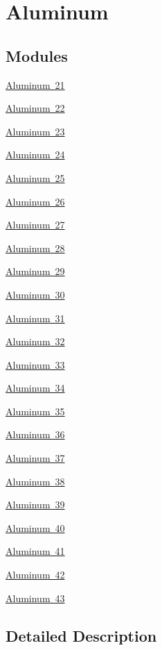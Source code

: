 \hypertarget{group___isotope_const-_aluminum}{}\section{Aluminum}
\label{group___isotope_const-_aluminum}
\subsection*{Modules}
\begin{DoxyCompactItemize}
\item 
\mbox{\hyperlink{group___isotope_const-_aluminum-_al21}{Aluminum 21}}
\item 
\mbox{\hyperlink{group___isotope_const-_aluminum-_al22}{Aluminum 22}}
\item 
\mbox{\hyperlink{group___isotope_const-_aluminum-_al23}{Aluminum 23}}
\item 
\mbox{\hyperlink{group___isotope_const-_aluminum-_al24}{Aluminum 24}}
\item 
\mbox{\hyperlink{group___isotope_const-_aluminum-_al25}{Aluminum 25}}
\item 
\mbox{\hyperlink{group___isotope_const-_aluminum-_al26}{Aluminum 26}}
\item 
\mbox{\hyperlink{group___isotope_const-_aluminum-_al27}{Aluminum 27}}
\item 
\mbox{\hyperlink{group___isotope_const-_aluminum-_al28}{Aluminum 28}}
\item 
\mbox{\hyperlink{group___isotope_const-_aluminum-_al29}{Aluminum 29}}
\item 
\mbox{\hyperlink{group___isotope_const-_aluminum-_al30}{Aluminum 30}}
\item 
\mbox{\hyperlink{group___isotope_const-_aluminum-_al31}{Aluminum 31}}
\item 
\mbox{\hyperlink{group___isotope_const-_aluminum-_al32}{Aluminum 32}}
\item 
\mbox{\hyperlink{group___isotope_const-_aluminum-_al33}{Aluminum 33}}
\item 
\mbox{\hyperlink{group___isotope_const-_aluminum-_al34}{Aluminum 34}}
\item 
\mbox{\hyperlink{group___isotope_const-_aluminum-_al35}{Aluminum 35}}
\item 
\mbox{\hyperlink{group___isotope_const-_aluminum-_al36}{Aluminum 36}}
\item 
\mbox{\hyperlink{group___isotope_const-_aluminum-_al37}{Aluminum 37}}
\item 
\mbox{\hyperlink{group___isotope_const-_aluminum-_al38}{Aluminum 38}}
\item 
\mbox{\hyperlink{group___isotope_const-_aluminum-_al39}{Aluminum 39}}
\item 
\mbox{\hyperlink{group___isotope_const-_aluminum-_al40}{Aluminum 40}}
\item 
\mbox{\hyperlink{group___isotope_const-_aluminum-_al41}{Aluminum 41}}
\item 
\mbox{\hyperlink{group___isotope_const-_aluminum-_al42}{Aluminum 42}}
\item 
\mbox{\hyperlink{group___isotope_const-_aluminum-_al43}{Aluminum 43}}
\end{DoxyCompactItemize}


\subsection{Detailed Description}

